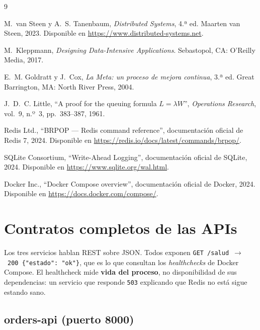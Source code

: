 \documentclass[12pt,a4paper]{article}
\begin{document}
\begin{thebibliography}{9}

 M.~van Steen y A.~S. Tanenbaum, \emph{Distributed
Systems}, 4.ª ed. Maarten van Steen, 2023. Disponible en
\url{https://www.distributed-systems.net}.

 M.~Kleppmann, \emph{Designing Data-Intensive
Applications}. Sebastopol, CA: O'Reilly Media, 2017.

 E.~M. Goldratt y J.~Cox, \emph{La Meta: un proceso de
mejora continua}, 3.ª ed. Great Barrington, MA: North River Press, 2004.

 J.~D.~C. Little, ``A proof for the queuing formula
$L = \lambda W$'', \emph{Operations Research}, vol.~9, n.º~3, pp.~383--387,
1961.

 Redis Ltd., ``BRPOP — Redis command reference'',
documentación oficial de Redis 7, 2024. Disponible en
\url{https://redis.io/docs/latest/commands/brpop/}.

 SQLite Consortium, ``Write-Ahead Logging'', documentación
oficial de SQLite, 2024. Disponible en \url{https://www.sqlite.org/wal.html}.

 Docker Inc., ``Docker Compose overview'', documentación
oficial de Docker, 2024. Disponible en
\url{https://docs.docker.com/compose/}.

\end{thebibliography}

\appendix
\newpage

\section{Contratos completos de las APIs}
\label{anexo:apis}

Los tres servicios hablan REST sobre JSON. Todos exponen
\texttt{GET /salud}~$\rightarrow$~\texttt{200 \{"estado": "ok"\}}, que es lo que
consultan los \emph{healthchecks} de Docker Compose. El healthcheck mide
\textbf{vida del proceso}, no disponibilidad de sus dependencias: un servicio que
responde \texttt{503} explicando que Redis no está sigue estando sano.

\subsection{orders-api (puerto 8000)}
\end{document}
